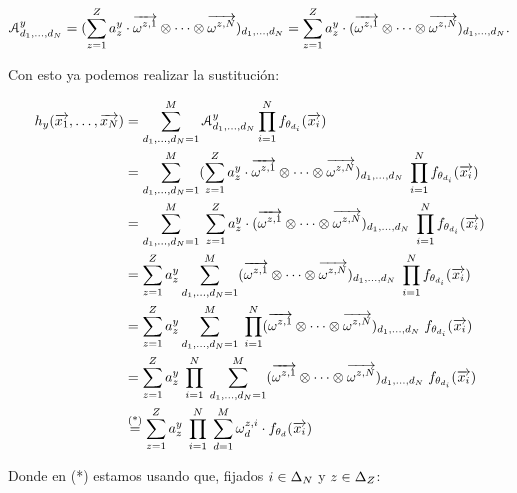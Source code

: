 \begin{equation}
	\mathcal{A}^y_{d_1, \ldots, d_N} = (\sum_{z = 1}^Z a_z^y \cdot \nv{\omega^{z, 1}} \otimes \cdots \otimes \nv{\omega^{z, N}})_{d_1, \ldots, d_N} = \sum_{z = 1}^Z a_z^y \cdot (\nv{\omega^{z, 1}} \otimes \cdots \otimes \nv{\omega^{z, N}})_{d_1, \ldots, d_N}.
\end{equation}

Con esto ya podemos realizar la sustitución:

\begin{equation}
	\begin{split}
        h_y(\nv{x_1}, \ldots, \nv{x_N}) &= \sum_{d_1, \ldots, d_N = 1}^{M} \mathcal{A}^y_{d_1, \ldots, d_N} \prod_{i = 1}^N f_{\theta_{d_i}}(\nv{x_i}) \\
        &= \sum_{d_1, \ldots, d_N = 1}^{M} (\sum_{z = 1}^Z a_z^y \cdot \nv{\omega^{z, 1}} \otimes \cdots \otimes \nv{\omega^{z, N}})_{d_1, \ldots, d_N} \; \prod_{i = 1}^N f_{\theta_{d_i}}(\nv{x_i}) \\
        &= \sum_{d_1, \ldots, d_N = 1}^{M} \; \sum_{z = 1}^Z a_z^y \cdot (\nv{\omega^{z, 1}} \otimes \cdots \otimes \nv{\omega^{z, N}})_{d_1, \ldots, d_N} \; \prod_{i = 1}^N f_{\theta_{d_i}}(\nv{x_i}) \\
        &= \sum_{z = 1}^Z a_z^y \sum_{d_1, \ldots, d_N = 1}^{M}  (\nv{\omega^{z, 1}} \otimes \cdots \otimes \nv{\omega^{z, N}})_{d_1, \ldots, d_N} \; \prod_{i = 1}^N f_{\theta_{d_i}}(\nv{x_i}) \\
        &= \sum_{z = 1}^Z a_z^y \sum_{d_1, \ldots, d_N = 1}^{M} \; \prod_{i = 1}^N (\nv{\omega^{z, 1}} \otimes \cdots \otimes \nv{\omega^{z, N}})_{d_1, \ldots, d_N}  \; f_{\theta_{d_i}}(\nv{x_i}) \\
        &= \sum_{z = 1}^Z a_z^y \; \prod_{i = 1}^N \; \sum_{d_1, \ldots, d_N = 1}^{M}  (\nv{\omega^{z, 1}} \otimes \cdots \otimes \nv{\omega^{z, N}})_{d_1, \ldots, d_N} \; f_{\theta_{d_i}}(\nv{x_i}) \\
        &\encima{=}{\text{(*)}} \sum_{z = 1}^Z a_z^y \; \prod_{i = 1}^N \; \sum_{d = 1}^{M} \omega_d^{z,i}  \cdot f_{\theta_{d}}(\nv{x_i})
	\end{split}
\end{equation}

Donde en (*) estamos usando que, fijados $i \in \deltaset{N}$ y $z \in \deltaset{Z}$:

